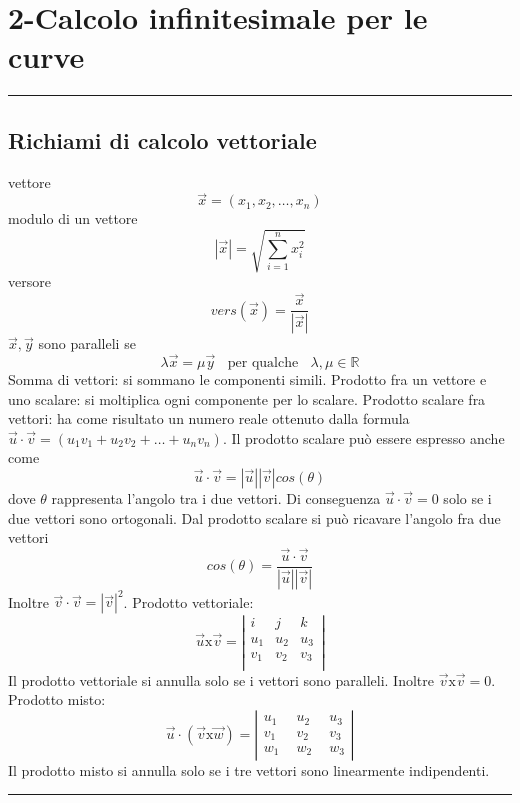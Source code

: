 \section*{2-Calcolo infinitesimale per le curve}
\rule{\textwidth}{2pt}
\subsection*{Richiami di calcolo vettoriale}
vettore
\[
    \vec{x} = (x_1, x_2, \dots, x_n)
\]
modulo di un vettore
\[
    |\vec{x}| = \sqrt{\sum_{i=1}^{n}x_i^2}
\]
versore
\[
    vers(\vec{x}) = \frac{\vec{x}}{|\vec{x}|}
\]
$\vec{x}, \vec{y}$ sono paralleli se
\[
    \lambda \vec{x} = \mu \vec{y}\;\; \text{ per qualche } \;\;\lambda, \mu \in \mathbb{R}
\]
Somma di vettori: si sommano le componenti simili.\newline
Prodotto fra un vettore e uno scalare: si moltiplica ogni componente per lo scalare.\newline
Prodotto scalare fra vettori: ha come risultato un numero reale ottenuto dalla formula $\vec{u} \cdot \vec{v} = (u_1 v_1 + u_2 v_2 + \dots + u_n v_n)$. Il prodotto scalare può essere espresso anche come
\[
    \vec{u} \cdot \vec{v} = |\vec{u}| |\vec{v}| cos(\theta)
\]
dove $\theta$ rappresenta l'angolo tra i due vettori. Di conseguenza $\vec{u} \cdot  \vec{v} = 0$ solo se i due vettori sono ortogonali.\newline
Dal prodotto scalare si può ricavare l'angolo fra due vettori
\[
    cos(\theta) = \frac{\vec{u} \cdot  \vec{v} }{|\vec{u}| |\vec{v}|}
\]
Inoltre $\vec{v} \cdot  \vec{v} = |\vec{v}|^2$.\newline
Prodotto vettoriale:
\[
    \vec{u}\text{x}\vec{v} = \left|\begin{matrix}
        i \;\; & j \;\;& k \;\;\\
        u_1 & u_2 & u_3\\
        v_1 & v_2 & v_3\\
    \end{matrix}\right|
\]
Il prodotto vettoriale si annulla solo se i vettori sono paralleli.\newline
Inoltre $\vec{v} \text{x} \vec{v} = 0$.\newline
Prodotto misto:
\[
    \vec{u} \cdot (\vec{v} \text{x} \vec{w}) = \left|\begin{matrix}
        u_1 \;\;& u_2 \;\;& u_3\\
        v_1 &v_2 & v_3\\
        w_1 &w_2 & w_3
    \end{matrix}\right|
\]
Il prodotto misto si annulla solo se i tre vettori sono linearmente indipendenti.\newline
\rule{\textwidth}{2pt}
